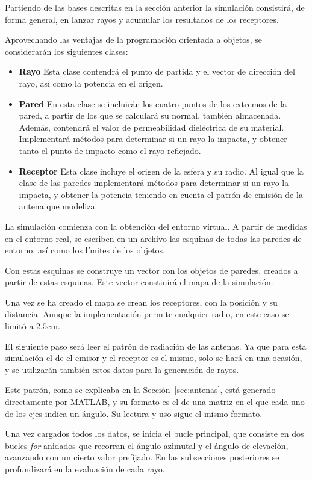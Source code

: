 Partiendo de las bases descritas en la sección anterior la simulación consistirá, de forma general, en lanzar rayos y acumular los resultados de los receptores.

Aprovechando las ventajas de la programación orientada a objetos, se considerarán los siguientes clases:
\begin{itemize}
    \item \textbf{Rayo} Esta clase contendrá el punto de partida y el vector de dirección del rayo, así como la potencia en el origen.
    \item \textbf{Pared} En esta clase se incluirán los cuatro puntos de los extremos de la pared, a partir de los que se calculará su normal, también almacenada. Además, contendrá el valor de permeabilidad dieléctrica de su material. Implementará métodos para determinar si un rayo la impacta, y obtener tanto el punto de impacto como el rayo reflejado.
    \item \textbf{Receptor} Esta clase incluye el origen de la esfera y su radio. Al igual que la clase de las paredes implementará métodos para determinar si un rayo la impacta, y obtener la potencia teniendo en cuenta el patrón de emisión de la antena que modeliza.
\end{itemize}

La simulación comienza con la obtención del entorno virtual.
A partir de medidas en el entorno real, se escriben en un archivo las esquinas de todas las paredes de entorno, así como los límites de los objetos.

Con estas esquinas se construye un vector con los objetos de paredes, creados a partir de estas esquinas.
Este vector constiuirá el mapa de la simulación.

Una vez se ha creado el mapa se crean los receptores, con la posición y su distancia.
Aunque la implementación permite cualquier radio, en este caso se limitó a $2.5$cm.

El siguiente paso será leer el patrón de radiación de las antenas.
Ya que para esta simulación el de el emisor y el receptor es el mismo, solo se hará en una ocasión, y se utilizarán también estos datos para la generación de rayos.

Este patrón, como se explicaba en la Sección~\ref{sec:antenas}, está generado directamente por MATLAB, y su formato es el de una matriz en el que cada uno de los ejes indica un ángulo.
Su lectura y uso sigue el mismo formato.

Una vez cargados todos los datos, se inicia el bucle principal, que consiste en dos bucles \textit{for} anidados que recorran el ángulo azimutal y el ángulo de elevación, avanzando con un cierto valor prefijado.
En las subsecciones posteriores se profundizará en la evaluación de cada rayo.

